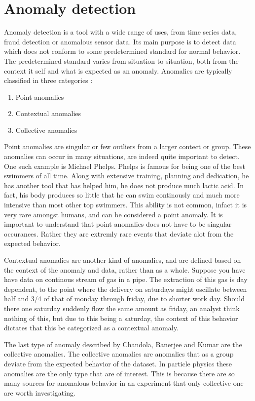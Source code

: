 \section*{Anomaly detection}
Anomaly detection is a tool with a wide range of uses, from time series data, fraud detection or anomalous sensor data. 
Its main purpose is to detect data which does not conform to some predetermined standard for normal behavior. 
The predetermined standard varies from situation to situation, both from the context it self and what is expected as an anomaly. 
Anomalies are typically classified in three categories \cite{anom_detec}:


\begin{enumerate}
    \item Point anomalies
    \item Contextual anomalies
    \item Collective anomalies
\end{enumerate}

Point anomalies are singular or few outliers from a larger contect or group. These anomalies can occur in many situations, are 
indeed quite important to detect. One such example is Michael Phelps. Phelps is famous for being one of the best swimmers of all time. 
Along with extensive training, planning and dedication, he has another tool that has helped him, he does not produce much lactic acid. 
In fact, his body produces so little that he can swim continously and much more intensive than most other top swimmers. This ability 
is not common, infact it is very rare amongst humans, and can be considered a point anomaly. It is important to understand that point anomalies
does not have to be singular occurances. Rather they are extremly rare events that deviate alot from the expected behavior. \par
Contextual anomalies are another kind of anomalies, and are defined based on the context of the anomaly and data, rather than as a whole. 
Suppose you have have data on continous stream of gas in a pipe. The extraction of this gas is day dependent, to the point where the delivery 
on saturdays might oscillate between half and 3/4 of that of monday through friday, due to shorter work day. Should there one saturday 
suddenly flow the same amount as friday, an analyst think nothing of this, but due to this being a saturday, the context of this behavior 
dictates that this be categorized as a contextual anomaly. \par 
The last type of anomaly described by Chandola, Banerjee and Kumar \cite{anom_detec} are the collective anomalies. The collective anomalies 
are anomalies that as a group deviate from the expected behavior of the dataset. In particle physics these anomalies are the only type that 
are of interest. This is because there are so many sources for anomalous behavior in an experiment that only collective one are worth investigating. 
